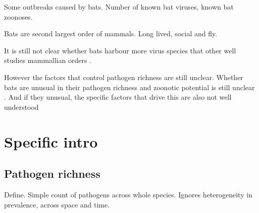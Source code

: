
Some outbreaks caused by bats.
Number of known bat viruses, known bat zoonoses.

Bats are second largest order of mammals.
Long lived, social and fly.

It is still not clear whether bats harbour more virus species that other well studies mammallian orders \cite{luis2013comparison, olival2015bats}.





However the factors that control pathogen richness are still unclear.
Whether bats are unusual in their pathogen richness and zoonotic potential is still unclear \cite{luis2013comparison, olival2015bats}.
And if they unusual, the specific factors that drive this are also not well understood \cite{luis2013comparison, wang2011mass, o2014bat, dobson2005links}



\section{Specific  intro}
\subsection{Pathogen richness}

Define.
Simple count of pathogens across whole species.
Ignores heterogeneity in prevalence, across space and time.









